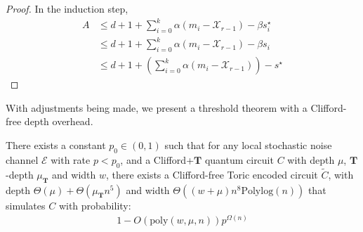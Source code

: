 \begin{proof}
  In the induction step, 
  \begin{equation*}
    \begin{split}
      A & \le d+1 + \sum_{i=0}^{k}\alpha(m_{i} - \mathcal{X}_{r-1}) - \beta s^{\star}_{i} \\
          &\le  d+1 + \sum_{i=0}^{k}\alpha(m_{i} - \mathcal{X}_{r-1}) - \beta s_{i} \\
          & \le  d+1 + \left(\sum_{i=0}^{k}\alpha(m_{i} - \mathcal{X}_{r-1}) \right) - s^{\star}   
    \end{split}
  \end{equation*}

\end{proof}




With adjustments being made, we present a threshold theorem with a Clifford-free depth overhead.
  \begin{theorem}
    \label{theorem:cliffordfree}
    There exists a constant $ p_{0} \in (0,1) $ such that for any local stochastic noise channel $\mathcal{E}$ with rate $ p < p_{0} $, and a Clifford+$\mathbf{T}$ quantum circuit $ C $ with depth $\mu$, $\mathbf{T}$-depth $\mu_{\mathbf{T}}$ and width $ w $, there exists a Clifford-free Toric encoded circuit $\tilde{C}$, with depth $ \Theta(\mu) + \Theta( \mu_{\mathbf{T}} n^{5}) $ and width $\Theta((w + \mu) n^{8} \text{Polylog}(n) )$ that simulates $ C $ with probability:
\begin{equation*}
  \begin{split}
    1 -   O \left( \text{poly}(w,\mu,n) \right)  p^{\Omega(n)} 
  \end{split}
\end{equation*}
  \end{theorem} 

